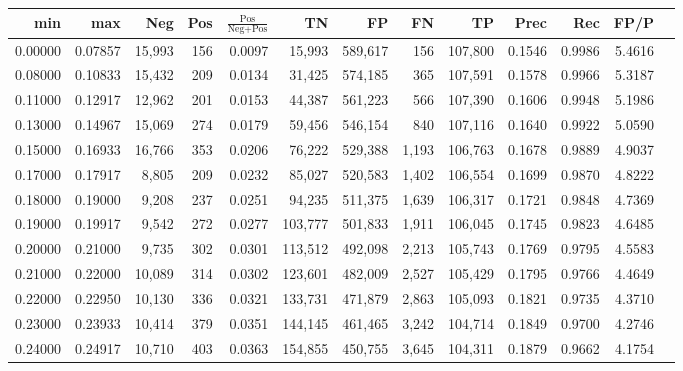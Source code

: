 \begin{tabular}{rrrrrrrrrrrrr}
\toprule
    min &     max &    Neg &   Pos & $\frac{\text{Pos}}{\text{Neg}+\text{Pos}}$ &      TN &      FP &      FN &      TP &   Prec &    Rec &   FP/P \\
\midrule
0.00000 & 0.07857 & 15,993 &   156 &                                     0.0097 &  15,993 & 589,617 &     156 & 107,800 & 0.1546 & 0.9986 & 5.4616 \\
0.08000 & 0.10833 & 15,432 &   209 &                                     0.0134 &  31,425 & 574,185 &     365 & 107,591 & 0.1578 & 0.9966 & 5.3187 \\
0.11000 & 0.12917 & 12,962 &   201 &                                     0.0153 &  44,387 & 561,223 &     566 & 107,390 & 0.1606 & 0.9948 & 5.1986 \\
0.13000 & 0.14967 & 15,069 &   274 &                                     0.0179 &  59,456 & 546,154 &     840 & 107,116 & 0.1640 & 0.9922 & 5.0590 \\
0.15000 & 0.16933 & 16,766 &   353 &                                     0.0206 &  76,222 & 529,388 &   1,193 & 106,763 & 0.1678 & 0.9889 & 4.9037 \\
0.17000 & 0.17917 &  8,805 &   209 &                                     0.0232 &  85,027 & 520,583 &   1,402 & 106,554 & 0.1699 & 0.9870 & 4.8222 \\
0.18000 & 0.19000 &  9,208 &   237 &                                     0.0251 &  94,235 & 511,375 &   1,639 & 106,317 & 0.1721 & 0.9848 & 4.7369 \\
0.19000 & 0.19917 &  9,542 &   272 &                                     0.0277 & 103,777 & 501,833 &   1,911 & 106,045 & 0.1745 & 0.9823 & 4.6485 \\
0.20000 & 0.21000 &  9,735 &   302 &                                     0.0301 & 113,512 & 492,098 &   2,213 & 105,743 & 0.1769 & 0.9795 & 4.5583 \\
0.21000 & 0.22000 & 10,089 &   314 &                                     0.0302 & 123,601 & 482,009 &   2,527 & 105,429 & 0.1795 & 0.9766 & 4.4649 \\
0.22000 & 0.22950 & 10,130 &   336 &                                     0.0321 & 133,731 & 471,879 &   2,863 & 105,093 & 0.1821 & 0.9735 & 4.3710 \\
0.23000 & 0.23933 & 10,414 &   379 &                                     0.0351 & 144,145 & 461,465 &   3,242 & 104,714 & 0.1849 & 0.9700 & 4.2746 \\
0.24000 & 0.24917 & 10,710 &   403 &                                     0.0363 & 154,855 & 450,755 &   3,645 & 104,311 & 0.1879 & 0.9662 & 4.1754 \\

\end{tabular}
